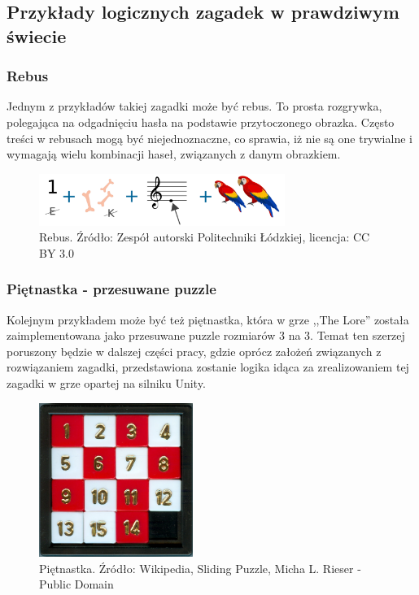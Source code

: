 \documentclass[oneside,polski,logo]{amuthesis}
\begin{document}
\subsection{Przykłady logicznych zagadek w prawdziwym świecie}
\subsubsection{Rebus}
\par Jednym z przykładów takiej zagadki może być rebus. To prosta rozgrywka, polegająca na odgadnięciu hasła na podstawie przytoczonego obrazka. Często treści w rebusach mogą być niejednoznaczne, co sprawia, iż nie są one trywialne i wymagają wielu kombinacji haseł, związanych z danym obrazkiem. \cite{rebus}
\begin{figure}[h]
	\centering
	\includegraphics[width=8cm]{images/tyrek/rebus.png}
	\caption{Rebus. Źródło: Zespół autorski Politechniki Łódzkiej, licencja: CC BY 3.0}
\end{figure}

\subsubsection{Piętnastka - przesuwane puzzle}
\par Kolejnym przykładem może być też piętnastka, która w grze ,,The Lore'' została zaimplementowana jako przesuwane puzzle rozmiarów 3 na 3. Temat ten szerzej poruszony będzie w dalszej części pracy, gdzie oprócz założeń związanych z rozwiązaniem zagadki, przedstawiona zostanie logika idąca za zrealizowaniem tej zagadki w grze opartej na silniku Unity. 
\begin{figure}[h]
	\centering
	\includegraphics[width=5cm]{images/tyrek/przesuwane-puzzle.jpg}
	\caption{Piętnastka. Źródło: Wikipedia, Sliding Puzzle, Micha L. Rieser - Public Domain}
\end{figure}
\end{document}
